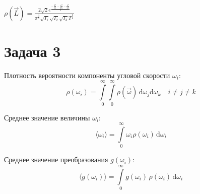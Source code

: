 \documentclass[11pt]{article}
\newcommand{\prompt}[4]{
        \llap{{{\ttfamily\color{#2}[#3]:\hspace{3pt}}#4}}\vspace{-\baselineskip}
    }
\begin{document}
            
\prompt{Out}{outcolor}{161}{}
    
    \(\displaystyle \rho(\vec L) = \frac{2 \sqrt{2} e^{\frac{- \frac{L_{3}^{2}}{2 I_{3}} - \frac{L_{2}^{2}}{2 I_{2}} - \frac{L_{1}^{2}}{2 I_{1}}}{T}}}{\pi^{\frac{3}{2}} \sqrt{I_{1}} \sqrt{I_{2}} \sqrt{I_{3}} T^{\frac{3}{2}}}\)

    

    \hypertarget{ux437ux430ux434ux430ux447ux430-3}{%
\section{Задача 3}\label{ux437ux430ux434ux430ux447ux430-3}}

    Плотность вероятности компоненты угловой скорости \(\omega_i\):
\[\rho(\omega_i) = \int \limits_0^\infty \!\!\! \int \limits_0^\infty \!
\rho(\vec\omega) \, \mathrm d\omega_j  \mathrm d\omega_k \quad i \neq j \neq k\]

Среднее значение величины \(\omega_i\):
\[\langle \omega_i \rangle = \int \limits_0^\infty \! \omega_i \rho(\omega_i) \, \mathrm d\omega_i\]

Среднее значение преобразования \(g(\omega_i)\):
\[\langle g(\omega_i) \rangle = \int \limits_0^\infty \! g(\omega_i) \, \rho(\omega_i) \, \mathrm d\omega_i\]
\end{document}
